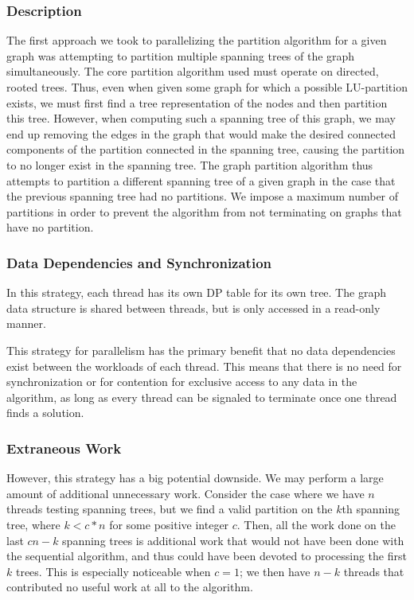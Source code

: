 \documentclass[11pt]{article}
\begin{document}
\subsubsection{Description}

The first approach we took to parallelizing the partition algorithm for a given graph was attempting to partition multiple spanning trees of the graph simultaneously.
The core partition algorithm used must operate on directed, rooted trees.
Thus, even when given some graph for which a possible LU-partition exists, we must first find a tree representation of the nodes and then partition this tree.
However, when computing such a spanning tree of this graph, we may end up removing the edges in the graph that would make the desired connected components of the partition connected in the spanning tree, causing the partition to no longer exist in the spanning tree.
The graph partition algorithm thus attempts to partition a different spanning tree of a given graph in the case that the previous spanning tree had no partitions.
We impose a maximum number of partitions in order to prevent the algorithm from not terminating on graphs that have no partition.

\subsubsection{Data Dependencies and Synchronization}

In this strategy, each thread has its own DP table for its own tree.
The graph data structure is shared between threads, but is only accessed in a read-only manner.

This strategy for parallelism has the primary benefit that no data dependencies exist between the workloads of each thread.
This means that there is no need for synchronization or for contention for exclusive access to any data in the algorithm, as long as every thread can be signaled to terminate once one thread finds a solution.

\subsubsection{Extraneous Work}

However, this strategy has a big potential downside.
We may perform a large amount of additional unnecessary work.
Consider the case where we have $n$ threads testing spanning trees, but we find a valid partition on the $k$th spanning tree, where $k < c * n$ for some positive integer $c$.
Then, all the work done on the last $cn - k$ spanning trees is additional work that would not have been done with the sequential algorithm, and thus could have been devoted to processing the first $k$ trees.
This is especially noticeable when $c = 1$; we then have $n - k$ threads that contributed no useful work at all to the algorithm.
\end{document}
